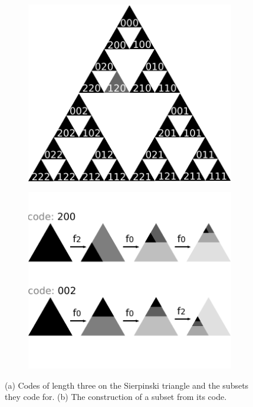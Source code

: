 \begin{figure}[b!]
  \centering
  \begin{subfigure}[b]{0.48\textwidth}
    \includegraphics[width=\textwidth]{./images/sierpinski-codes.pdf}
    \caption{}
    \label{fig:sierpinski-codes}
  \end{subfigure}  
  \hspace{0.015\textwidth}
  \begin{subfigure}[b]{0.48\textwidth}
    \includegraphics[width=\textwidth]{./images/code-construction.pdf}
    \caption{}
    \label{fig:code-construction}
  \end{subfigure}

  \caption{\small (a) Codes of length three on the Sierpinski triangle and the subsets they code for. (b) The construction of a subset from its code.}
  \label{figure:codes}
\end{figure}

